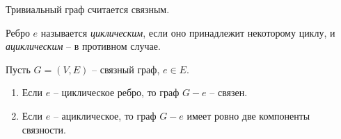 \begin{remark}
    Тривиальный граф считается связным.
\end{remark}

\begin{definition}
    Ребро $ e $ называется \emph{циклическим}, если оно принадлежит некоторому циклу, и \emph{ациклическим} -- в противном случае.
\end{definition}

\begin{lemma}
    Пусть $ G = (V,E) $ -- связный граф, $ e \in E $.
    \begin{enumerate}
        \item Если $ e $ -- циклическое ребро, то граф $ G - e $ -- связен.
        \item Если $ e $ -- ациклическое, то граф $ G - e $ имеет ровно две компоненты связности.
    \end{enumerate}
\end{lemma}

